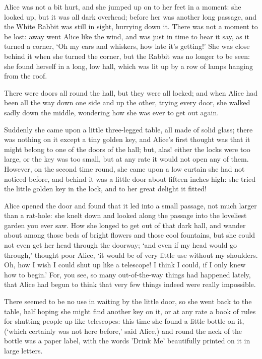 \documentclass[
    11pt,
    a4paper
]{article}
\begin{document}
Alice was not a bit hurt, and she jumped up on to her feet in a moment:
she looked up, but it was all dark overhead; before her was another
long passage, and the White Rabbit was still in sight, hurrying down it.
There was not a moment to be lost: away went Alice like the wind, and
was just in time to hear it say, as it turned a corner, `Oh my ears
and whiskers, how late it's getting!' She was close behind it when she
turned the corner, but the Rabbit was no longer to be seen: she found
herself in a long, low hall, which was lit up by a row of lamps hanging
from the roof.

There were doors all round the hall, but they were all locked; and when
Alice had been all the way down one side and up the other, trying every
door, she walked sadly down the middle, wondering how she was ever to
get out again.

Suddenly she came upon a little three-legged table, all made of solid
glass; there was nothing on it except a tiny golden key, and Alice's
first thought was that it might belong to one of the doors of the hall;
but, alas! either the locks were too large, or the key was too small,
but at any rate it would not open any of them. However, on the second
time round, she came upon a low curtain she had not noticed before, and
behind it was a little door about fifteen inches high: she tried the
little golden key in the lock, and to her great delight it fitted!

Alice opened the door and found that it led into a small passage, not
much larger than a rat-hole: she knelt down and looked along the passage
into the loveliest garden you ever saw. How she longed to get out of
that dark hall, and wander about among those beds of bright flowers and
those cool fountains, but she could not even get her head through the
doorway; `and even if my head would go through,' thought poor Alice, `it
would be of very little use without my shoulders. Oh, how I wish I could
shut up like a telescope! I think I could, if I only knew how to begin.'
For, you see, so many out-of-the-way things had happened lately,
that Alice had begun to think that very few things indeed were really
impossible.

There seemed to be no use in waiting by the little door, so she went
back to the table, half hoping she might find another key on it, or at
any rate a book of rules for shutting people up like telescopes: this
time she found a little bottle on it, (`which certainly was not here
before,' said Alice,) and round the neck of the bottle was a paper
label, with the words 'Drink Me' beautifully printed on it in large
letters.
\end{document}
